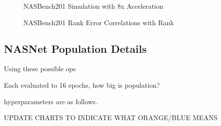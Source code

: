 \documentclass[twocolumn]{article}
\begin{document}
\begin{figure}
    \begin{center}
        
    \end{center}
    \caption{NASBench201 Simulation with 8x Acceleration}
    \label{fig:nasbench_8x_acceleration}
\end{figure}

\begin{figure}
    \begin{center}
        
    \end{center}
    \caption{NASBench201 Rank Error Correlations with Rank}
    \label{fig:nasbench_rank_error_correlations}
\end{figure}

\FloatBarrier
\clearpage
\subsection{NASNet Population Details}

Using these possible ops

Each evaluated to 16 epochs, how big is population?

hyperparameters are as follows.

UPDATE CHARTS TO INDICATE WHAT ORANGE/BLUE MEANS
\end{document}
